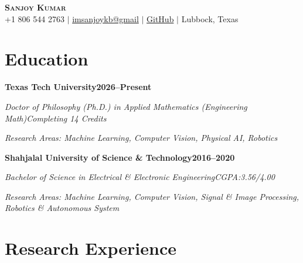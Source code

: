 \documentclass[10pt,letterpaper]{article}
\newcommand{\entry}[2]{\vspace{2pt}\par\noindent\textbf{#1}\hfill\textbf{#2}\par\nopagebreak}
\newcommand{\sub}[2]{\noindent\hspace{0.8em}\textit{#1}\hfill\textit{#2}\par\nopagebreak}
\begin{document}
\begin{center}
  {\Huge\bfseries\scshape Sanjoy Kumar}\\[5pt]
  {\normalsize +1 806 544 2763 $\mid$ \href{mailto:sanjoy.eee32@gmail.com}{imsanjoykb@gmail} $\mid$ \href{https://github.com/imsanjoykb}{GitHub} $\mid$ Lubbock, Texas}
\end{center}
\vspace{-6pt}

\section{Education}
\entry{Texas Tech University}{2026--Present}
\sub{Doctor of Philosophy (Ph.D.) in Applied Mathematics (Engineering Math)}{Completing 14 Credits}
\sub{Research Areas: Machine Learning, Computer Vision, Physical AI, Robotics}{}
\vspace{3pt}
\entry{Shahjalal University of Science \& Technology}{2016--2020}
\sub{Bachelor of Science in Electrical \& Electronic Engineering}{CGPA:3.56/4.00}
\sub{Research Areas: Machine Learning, Computer Vision, Signal \& Image Processing, Robotics \& Autonomous System}{}

\section{Research Experience}
\end{document}
